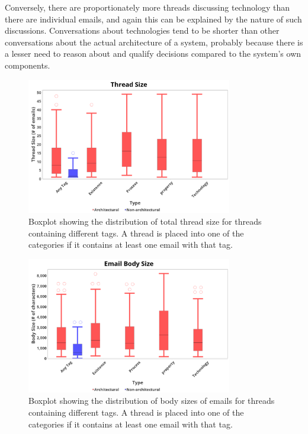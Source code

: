 \documentclass[a4paper, 12pt]{article}
\begin{document}
		Conversely, there are proportionately more threads discussing technology than there are individual emails, and again this can be explained by the nature of such discussions. Conversations about technologies tend to be shorter than other conversations about the actual architecture of a system, probably because there is a lesser need to reason about and qualify decisions compared to the system's own components.
		
		\begin{figure}[H]
			\centering
			\includegraphics[width=0.8\textwidth]{report/thread_size.png}
			\caption{Boxplot showing the distribution of total thread size for threads containing different tags. A thread is placed into one of the categories if it contains at least one email with that tag.}
			\label{fig:threadsize}
		\end{figure}
	
		\begin{figure}[H]
			\centering
			\includegraphics[width=0.8\textwidth]{report/body_size.png}
			\caption{Boxplot showing the distribution of body sizes of emails for threads containing different tags. A thread is placed into one of the categories if it contains at least one email with that tag.}
			\label{fig:bodysize}
		\end{figure}
	
\end{document}
